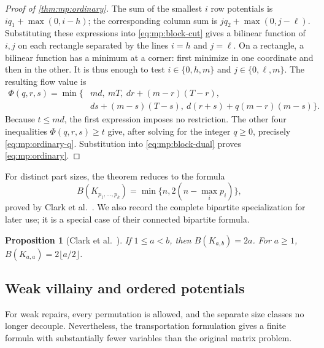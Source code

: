 \documentclass[10pt,a4paper]{amsart}
\numberwithin{equation}{section}
\newtheorem{proposition}[theorem]{Proposition}
\theoremstyle{definition}
\theoremstyle{remark}
\begin{document}
\begin{proof}[Proof of \cref{thm:mp:ordinary}]
The sum of the smallest $i$ row potentials is
$iq_1+\max(0,i-h)$; the corresponding column sum is
$jq_2+\max(0,j-\ell)$. Substituting these expressions into
\eqref{eq:mp:block-cut} gives a bilinear function of $i,j$ on each
rectangle separated by the lines $i=h$ and $j=\ell$. On a rectangle,
a bilinear function has a minimum at a corner: first minimize in one
coordinate and then in the other. It is thus enough to test
$i\in\{0,h,m\}$ and $j\in\{0,\ell,m\}$. The resulting flow value is
\begin{equation}\label{eq:mp:balanced-flow}
\begin{split}
 \Phi(q,r,s)=\min\{&md,\ mT,\ dr+(m-r)(T-r),\\
                  &ds+(m-s)(T-s),\ d(r+s)+q(m-r)(m-s)\}.
\end{split}
\end{equation}
Because $t\le md$, the first expression imposes no restriction. The
other four inequalities $\Phi(q,r,s)\ge t$ give, after solving for the
integer $q\ge0$, precisely \eqref{eq:mp:ordinary-q}. Substitution into
\eqref{eq:mp:block-dual} proves \eqref{eq:mp:ordinary}.
\end{proof}

For distinct part sizes, the theorem reduces to the formula
\[
 B(K_{p_1,\ldots,p_k})=\min\{n,2(n-\max_i p_i)\},
\]
proved by Clark et al.~\cite[Proposition~4.1]{clark2006}. We also record
the complete bipartite specialization for later use; it is a special
case of their connected bipartite formula.

\begin{proposition}[Clark et al.~\cite{clark2006}]
\label{cor:mp:bipartite}
If $1\le a<b$, then $B(K_{a,b})=2a$. For $a\ge1$,
$B(K_{a,a})=2\lfloor a/2\rfloor$.
\end{proposition}

\subsection{Weak villainy and ordered potentials}

For weak repairs, every permutation is allowed, and the separate size
classes no longer decouple. Nevertheless, the transportation formulation
gives a finite formula with substantially fewer variables than the
original matrix problem.
\end{document}
